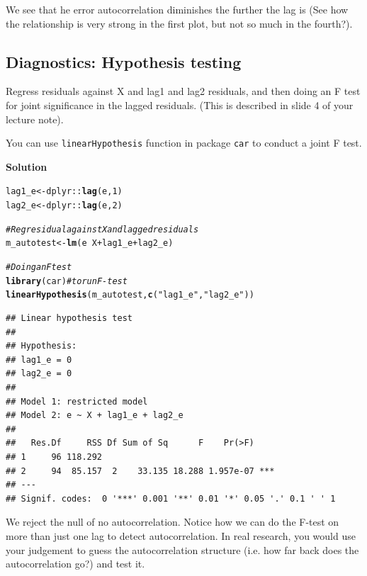 \documentclass{article}\usepackage[]{graphicx}\usepackage[]{color}
\makeatletter
\newcommand{\hlnum}[1]{\textcolor[rgb]{0.686,0.059,0.569}{#1}}%
\newcommand{\hlstr}[1]{\textcolor[rgb]{0.192,0.494,0.8}{#1}}%
\newcommand{\hlcom}[1]{\textcolor[rgb]{0.678,0.584,0.686}{\textit{#1}}}%
\newcommand{\hlopt}[1]{\textcolor[rgb]{0,0,0}{#1}}%
\newcommand{\hlstd}[1]{\textcolor[rgb]{0.345,0.345,0.345}{#1}}%
\newcommand{\hlkwb}[1]{\textcolor[rgb]{0.69,0.353,0.396}{#1}}%
\newcommand{\hlkwd}[1]{\textcolor[rgb]{0.737,0.353,0.396}{\textbf{#1}}}%
\newenvironment{kframe}{%
 \def\at@end@of@kframe{}%
 \ifinner\ifhmode%
  \def\at@end@of@kframe{\end{minipage}}%
  \begin{minipage}{\columnwidth}%
 \fi\fi%
 \def\FrameCommand##1{\hskip\@totalleftmargin \hskip-\fboxsep
 \colorbox{shadecolor}{##1}\hskip-\fboxsep
     \hskip-\linewidth \hskip-\@totalleftmargin \hskip\columnwidth}%
 \MakeFramed {\advance\hsize-\width
   \@totalleftmargin\z@ \linewidth\hsize
   \@setminipage}}%
 {\par\unskip\endMakeFramed%
 \at@end@of@kframe}
\newenvironment{knitrout}{}{} %
\makeatother
\begin{document}
We see that he error autocorrelation diminishes the further the lag is (See how the relationship is very strong in the first plot, but not so much in the fourth?).

\subsection{Diagnostics: Hypothesis testing}

Regress residuals against X and lag1 and lag2 residuals, and then doing an F test for joint significance in the lagged residuals. (This is described in slide 4 of your lecture note).

You can use \verb`linearHypothesis` function in package \verb`car` to conduct a joint F test.

\textbf{Solution}

\begin{knitrout}
\color{fgcolor}\begin{kframe}
\begin{alltt}
\hlstd{lag1_e} \hlkwb{<-} \hlstd{dplyr}\hlopt{::}\hlkwd{lag}\hlstd{(e,} \hlnum{1}\hlstd{)}
\hlstd{lag2_e} \hlkwb{<-} \hlstd{dplyr}\hlopt{::}\hlkwd{lag}\hlstd{(e,} \hlnum{2}\hlstd{)}

\hlcom{# Reg residual against X and lagged residuals}
\hlstd{m_autotest} \hlkwb{<-} \hlkwd{lm}\hlstd{(e} \hlopt{~} \hlstd{X} \hlopt{+} \hlstd{lag1_e} \hlopt{+} \hlstd{lag2_e)}

\hlcom{# Doing an F test}
\hlkwd{library}\hlstd{(car)} \hlcom{# to run F-test}
\hlkwd{linearHypothesis}\hlstd{(m_autotest,} \hlkwd{c}\hlstd{(}\hlstr{"lag1_e"}\hlstd{,} \hlstr{"lag2_e"}\hlstd{))}
\end{alltt}
\begin{verbatim}
## Linear hypothesis test
## 
## Hypothesis:
## lag1_e = 0
## lag2_e = 0
## 
## Model 1: restricted model
## Model 2: e ~ X + lag1_e + lag2_e
## 
##   Res.Df     RSS Df Sum of Sq      F    Pr(>F)    
## 1     96 118.292                                  
## 2     94  85.157  2    33.135 18.288 1.957e-07 ***
## ---
## Signif. codes:  0 '***' 0.001 '**' 0.01 '*' 0.05 '.' 0.1 ' ' 1
\end{verbatim}
\end{kframe}
\end{knitrout}

We reject the null of no autocorrelation. Notice how we can do the F-test on more than just one lag to detect autocorrelation. In real research, you would use your judgement to guess the autocorrelation structure (i.e. how far back does the autocorrelation go?) and test it.
\end{document}
